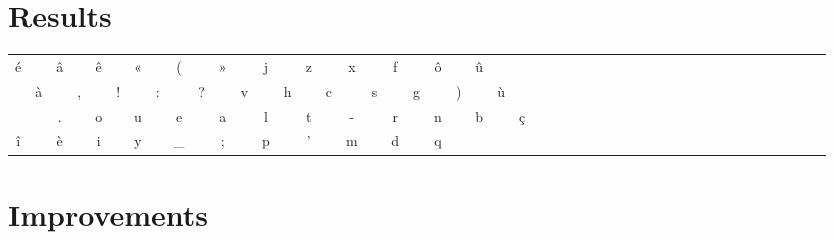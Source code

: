 \documentclass[a4paper,titlepage]{article}
\begin{document}
\paragraph{}



\section{Results}
\begin{tabular}{cccccccccccccccccccccccccccccccccccccccccccccc}
é & & â & & ê & & « & & ( & & » & & j & & z & & x & & f & & ô & & û & \\
 & à & & , & & ! & & : & & ? & & v & & h & & c & & s & & g & & ) & & ù\\
  & & . & & o & & u & & e & & a & & l & & t & & - & & r & & n & & b & & ç\\
î & & è & & i & & y & & \_ & & ; & & p & & ' & & m & & d & & q & & & \\
\end{tabular}

\section{Improvements}

\newpage
\end{document}
